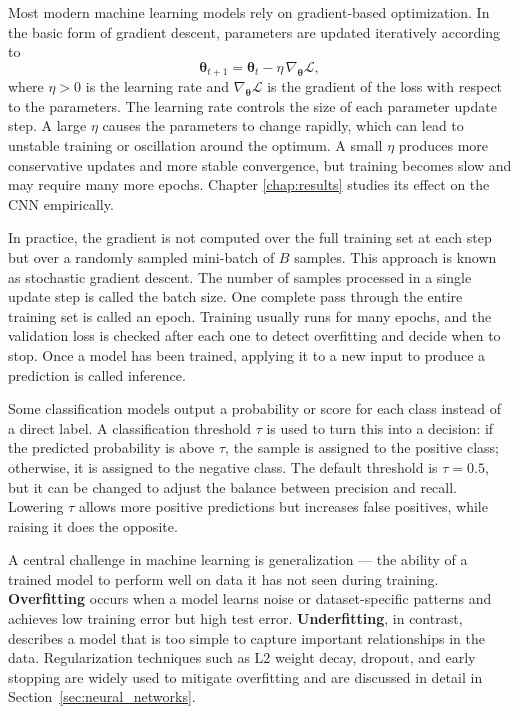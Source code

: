 Most modern machine learning models rely on gradient-based optimization. In the basic form of gradient descent, parameters are updated iteratively according to
\begin{equation}
  \boldsymbol{\theta}_{t+1} = \boldsymbol{\theta}_t
    - \eta\, \nabla_{\boldsymbol{\theta}} \mathcal{L},
\end{equation}
where $\eta > 0$ is the learning rate and $\nabla_{\boldsymbol{\theta}} \mathcal{L}$ is the gradient of the loss with respect to the parameters. The learning rate controls the size of each parameter update step. A large $\eta$ causes the parameters to change rapidly, which can lead to unstable training or oscillation around the optimum. A small $\eta$ produces more conservative updates and more stable convergence, but training becomes slow and may require many more epochs. Chapter \ref{chap:results} studies its effect on the CNN empirically. 

In practice, the gradient is not computed over the full training set at each step but over a randomly sampled mini-batch of $B$ samples. This approach is known as stochastic gradient descent. The number of samples processed in a single update step is called the batch size. One complete pass through the entire training set is called an epoch. Training usually runs for many epochs, and the validation loss is checked after each one to detect overfitting and decide when to stop. Once a model has been trained, applying it to a new input to produce a prediction is called inference.

Some classification models output a probability or score for each class instead of a direct label. A classification threshold $\tau$ is used to turn this into a decision: if the predicted probability is above $\tau$, the sample is assigned to the positive class; otherwise, it is assigned to the negative class. The default threshold is $\tau = 0.5$, but it can be changed to adjust the balance between precision and recall. Lowering $\tau$ allows more positive predictions but increases false positives, while raising it does the opposite.

A central challenge in machine learning is generalization — the ability of a trained model to perform well on data it has not seen during training. \textbf{Overfitting} occurs when a model learns noise or dataset-specific patterns and achieves low training error but high test error. \textbf{Underfitting}, in contrast, describes a model that is too simple to capture important relationships in the data. Regularization techniques such as L2 weight decay, dropout, and early stopping are widely used to mitigate overfitting and are discussed in detail in Section~\ref{sec:neural_networks}.

